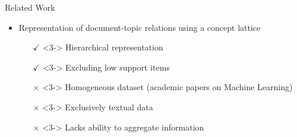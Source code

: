 \begin{frame}{Related Work}
    
    \begin{itemize}
   
        \item<1-> Representation of document-topic relations using a concept lattice~\parencite{topic_modeling_2024}
        \begin{itemize}
            \item[$\checkmark$]<3-> Hierarchical representation
            \item[$\checkmark$]<3-> Excluding low support items
            \item[$\times$]<3-> Homogeneous dataset (academic papers on Machine Learning)
            \item[$\times$]<3-> Exclusively textual data
            \item[$\times$]<3-> Lacks ability to aggregate information 
        \end{itemize}
    \end{itemize}



\end{frame}
